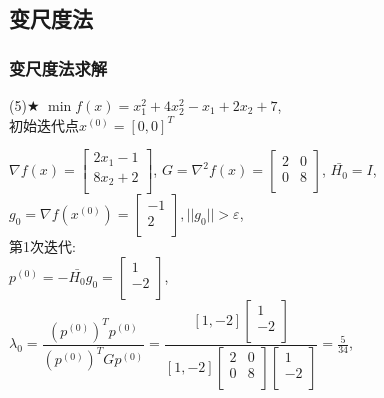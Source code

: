 \subsection{变尺度法}

\subsubsection{变尺度法求解}

\begin{problem}{(5)$\bigstar$}
    $\min f(x)=x_1^2+4x_2^2-x_1+2x_2+7$,\\
    初始迭代点${x^{(0)}}=[0,0]^T$
\end{problem}
\begin{solution}
    $\nabla f(x)=\begin{bmatrix}
        2x_1-1  \\
        8x_2+2  \\
    \end{bmatrix}$,
    $G=\nabla^2 f(x)=\begin{bmatrix}
        2 & 0  \\
        0  & 8  \\
    \end{bmatrix}$,
    $\bar{H_0}=I$,\\
    $g_0=\nabla f(x^{(0)})=\begin{bmatrix} -1\\2\\\end{bmatrix},||g_0||>\varepsilon$,\\
    第1次迭代:\\
    $p^{(0)}=-\bar{H_0}g_0=\begin{bmatrix} 1\\-2\\\end{bmatrix}$,\\
    $\lambda_0=\dfrac{(p^{(0)})^Tp^{(0)}}{(p^{(0)})^TGp^{(0)}}=\dfrac{[1,-2]\begin{bmatrix} 1\\-2\\\end{bmatrix}}{[1,-2]\begin{bmatrix}
        2 & 0  \\
        0  & 8  \\
    \end{bmatrix}\begin{bmatrix} 1\\-2\\\end{bmatrix}}=\frac{5}{34}$,\\

\end{solution}

